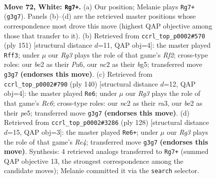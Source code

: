 \documentclass[11pt]{article}
\begin{document}
\clearpage

\begin{figure}[p]\centering
\begin{subfigure}{0.46\textwidth}\centering
\resizebox{\linewidth}{!}{%
\newchessgame
\chessboard[
  setfen={8/7k/5B2/8/r7/6R1/2n1bP1K/8 w - - 4 72},
  showmover=false,
  pgfstyle=straightmove, color=movearrow, markmove={g3-g7}
]}
\caption{}
\end{subfigure}\hfill
\begin{subfigure}{0.46\textwidth}\centering
\resizebox{\linewidth}{!}{%
\newchessgame
\chessboard[
  setfen={4k3/5r2/p7/6B1/3R4/7r/4K3/8 b - - 1 76},
  showmover=false,
  pgfstyle=straightmove, color=movearrow, markmove={f7-f3}
]}
\caption{}
\end{subfigure}
\\[4pt]
\begin{subfigure}{0.46\textwidth}\centering
\resizebox{\linewidth}{!}{%
\newchessgame
\chessboard[
  setfen={8/5k2/2R5/1K1Pp3/8/r7/8/8 w - - 13 71},
  showmover=false,
  pgfstyle=straightmove, color=movearrow, markmove={c6-e6}
]}
\caption{}
\end{subfigure}\hfill
\begin{subfigure}{0.46\textwidth}\centering
\resizebox{\linewidth}{!}{%
\newchessgame
\chessboard[
  setfen={2B5/8/5kn1/3K4/4R3/6b1/8/8 w - - 47 65},
  showmover=false,
  pgfstyle=straightmove, color=movearrow, markmove={e4-e6}
]}
\caption{}
\end{subfigure}
\caption{\textbf{Move 72, White: \texttt{Rg7+}.} (a) Our position; Melanie plays \texttt{Rg7+} (\texttt{g3g7}). Panels (b)--(d) are the retrieved master positions whose correspondence most drove this move (highest QAP objective among those that transfer to it). (b) Retrieved from \texttt{ccrl\_top\_p0002\#570} (ply 151) [structural distance $d$=11, QAP obj=4]: the master played \texttt{Rff3}; under $\mu$ our \emph{Rg3} plays the role of that game's \emph{Rf2}; cross-type roles: our \emph{b}e2 as their \emph{P}a6, our \emph{n}c2 as their \emph{b}g5; transferred move \texttt{g3g7} \textbf{(endorses this move)}. (c) Retrieved from \texttt{ccrl\_top\_p0002\#790} (ply 140) [structural distance $d$=12, QAP obj=4]: the master played \texttt{Re6}; under $\mu$ our \emph{Rg3} plays the role of that game's \emph{Rc6}; cross-type roles: our \emph{n}c2 as their \emph{r}a3, our \emph{b}e2 as their \emph{p}e5; transferred move \texttt{g3g7} \textbf{(endorses this move)}. (d) Retrieved from \texttt{ccrl\_top\_p0002\#3286} (ply 128) [structural distance $d$=15, QAP obj=3]: the master played \texttt{Re6+}; under $\mu$ our \emph{Rg3} plays the role of that game's \emph{Re4}; transferred move \texttt{g3g7} \textbf{(endorses this move)}. Synthesis: 4 retrieved analogs transferred to \texttt{Rg7+} (summed QAP objective 13, the strongest correspondence among the candidate moves); Melanie committed it via the \texttt{search} selector.}
\label{fig:thought-m142}
\end{figure}
\end{document}
